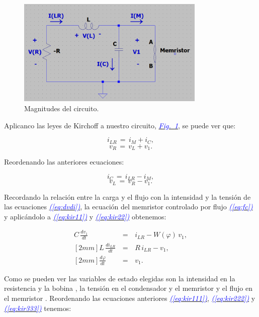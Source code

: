 \documentclass[12pt,a4paper]{report} %
\newcommand{\fref}[1]{\hyperref[#1]{\textcolor{blue}{\textit{Fig.~\ref*{#1}}}}}
\newcommand{\eref}[1]{\hyperref[#1]{\textcolor{blue}{\textit{(\ref*{#1})}}}}
\begin{document}
	\begin{figure}[h]
		\centering
		\includegraphics[width=0.8\textwidth]{circuito.png}
		\caption{Magnitudes del circuito.}
		\label{fig:circuito}
	\end{figure}\smallskip
	
	Aplicanco las leyes de Kirchoff a nuestro circuito, \fref{fig:circuito}, se puede ver que:
	
	\begin{equation}
		i_{LR}\,=\,i_M+i_C,
		\label{eq:kir1}
	\end{equation}
	\begin{equation}
		v_R\,=\,v_L+v_1.
		\label{eq:kir2}
	\end{equation}
	
	Reordenando las anteriores ecuaciones:
	
	\begin{equation}
		i_C\,=\,i_{LR}-i_M,
		\label{eq:kir11}
	\end{equation}
	\begin{equation}
		v_L\,=\,v_R-v_1.
		\label{eq:kir22}
	\end{equation}
	
	Recordando la relación entre la carga y el flujo con la intensidad y la tensión de las ecuaciones \eref{eq:dvdi}, la ecuación del memristor controlado por flujo \eref{eq:fc} y aplicándolo a \eref{eq:kir11} y \eref{eq:kir22} obtenemos:
	
	
	\begin{eqnarray}
		C\,\frac{dv_1}{dt}\,&=&\,i_{LR}-W(\varphi)\,v_1 \label{eq:kir111}, \\ [2mm]
		L\,\frac{di_{LR}}{dt}\,&=&\,R\,i_{LR}-v_1 \label{eq:kir222}, \\ [2mm]
		\frac{d\varphi}{dt}\,&=&\,v_1. \label{eq:kir333}
	\end{eqnarray}\smallskip
	
	Como se pueden ver las variables de estado elegidas son la intensidad en la resistencia y la bobina , la tensión en el condensador y el memristor  y el flujo en el memristor \bm{$\varphi$}.
	\newpage
	Reordenando las ecuaciones anteriores \eref{eq:kir111}, \eref{eq:kir222} y \eref{eq:kir333} tenemos:
	
\end{document}
